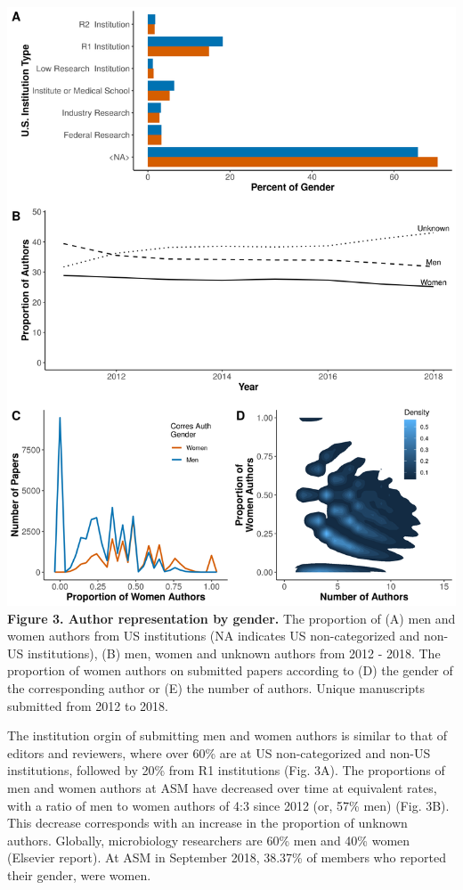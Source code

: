 \documentclass[11pt,]{article}
\begin{document}
\includegraphics{Figure_3.png} \textbf{Figure 3. Author representation
by gender.} The proportion of (A) men and women authors from US
institutions (NA indicates US non-categorized and non-US institutions),
(B) men, women and unknown authors from 2012 - 2018. The proportion of
women authors on submitted papers according to (D) the gender of the
corresponding author or (E) the number of authors. Unique manuscripts
submitted from 2012 to 2018.

The institution orgin of submitting men and women authors is similar to
that of editors and reviewers, where over 60\% are at US non-categorized
and non-US institutions, followed by 20\% from R1 institutions (Fig.
3A). The proportions of men and women authors at ASM have decreased over
time at equivalent rates, with a ratio of men to women authors of 4:3
since 2012 (or, 57\% men) (Fig. 3B). This decrease corresponds with an
increase in the proportion of unknown authors. Globally, microbiology
researchers are 60\% men and 40\% women (Elsevier report). At ASM in
September 2018, 38.37\% of members who reported their gender, were
women.
\end{document}
